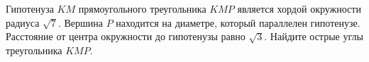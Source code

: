 \begin{ex}
	\begin{condition}
		Гипотенуза \( KM  \) прямоугольного треугольника \( KMP  \) является хордой окружности радиуса \( \sqrt{7} \). Вершина \( P  \) находится на диаметре, который параллелен гипотенузе. Расстояние от центра окружности до	гипотенузы равно \( \sqrt{3} \). Найдите острые углы треугольника \( KMP \).
	\end{condition}
\end{ex}